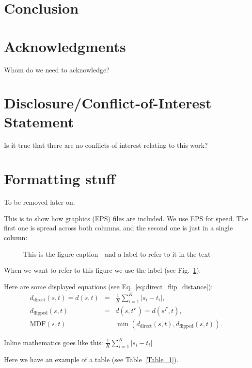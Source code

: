 \documentclass{bioinfo}
\begin{document}
\section{Conclusion}


\section*{Acknowledgments}
Whom do we need to acknowledge?

\section*{Disclosure/Conflict-of-Interest Statement}
Is it true that there are no conflicts of interest relating to this
work?


\section*{Formatting stuff}

To be removed later on.

This is to show how graphics (EPS) files are included. We use EPS for
speed. The first one is spread across both columns, and the second one
is just in a single column:

\begin{figure}
\caption{This is the figure caption - and a label to refer to it in the text \label{Fig:big_picture}}

\end{figure}

When we want to refer to this figure we use the label (see
Fig.~\ref{Fig:big_picture}).


Here are some displayed equations (see Eq.~\ref{eq:direct_flip_distance}):
\begin{eqnarray}
  d_{\textrm{direct}}(s, t) = d(s, t) & = & \frac{1}{K}\sum_{i=1}^{K}|s_{i}-t_{i}|,\nonumber\\
  d_{\textrm{flipped}}(s, t) & = & d(s,t^F) = d(s^F,t),\nonumber\\
  \textrm{MDF}(s, t) & = & \min(d_{\textrm{direct}}(s, t), d_{\textrm{flipped}}(s, t))\label{eq:direct_flip_distance}.
\end{eqnarray}

Inline mathematics goes like this: $\frac{1}{K}\sum_{i=1}^{K}|s_{i}-t_{i}|$

Here we have an example of a table (see Table~\ref{Table_1}).
\end{document}

